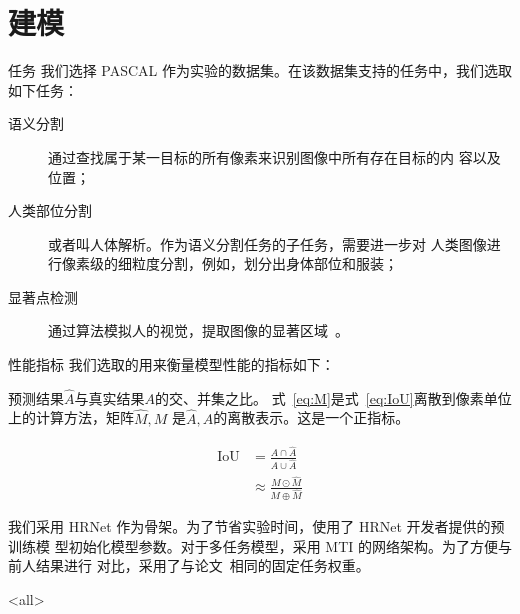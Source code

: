 \documentclass[../main]{subfiles}
\begin{document}
\section{建模}%
\label{sec:model}

\begin{frame}{任务}
  我们选择 PASCAL 作为实验的数据集。在该数据集支持的任务中，我们选取如下任务：

  \begin{description}
    \item[语义分割]通过查找属于某一目标的所有像素来识别图像中所有存在目标的内
      容以及位置；
    \item[人类部位分割]或者叫人体解析。作为语义分割任务的子任务，需要进一步对
      人类图像进行像素级的细粒度分割，例如，划分出身体部位和服装；
    \item[显著点检测]通过算法模拟人的视觉，提取图像的显著区域~\cite{730558}。
  \end{description}
\end{frame}

\begin{frame}{性能指标}
  我们选取的用来衡量模型性能的指标如下：

  \begin{definition}[IoU]
    预测结果$\hat{A}$与真实结果$A$的交、并集之比。
    式~\ref{eq:M}是式~\ref{eq:IoU}离散到像素单位上的计算方法，矩阵$\hat{M}, M$
    是$\hat{A}, A$的离散表示。这是一个正指标。
  \end{definition}

  \begin{align}
    \label{eq:IoU}
    \mathrm{IoU} & = \frac{A \cap \hat{A}}{A \cup \hat{A}} \\
    \label{eq:M}
                 & \approx \frac{M \odot \hat{M}}{M \oplus \hat{M}}
  \end{align}
\end{frame}

我们采用 HRNet 作为骨架。为了节省实验时间，使用了 HRNet 开发者提供的预训练模
型初始化模型参数。对于多任务模型，采用 MTI 的网络架构。为了方便与前人结果进行
对比，采用了与论文~\cite{9336293}相同的固定任务权重。

\mode<all>
\end{document}
